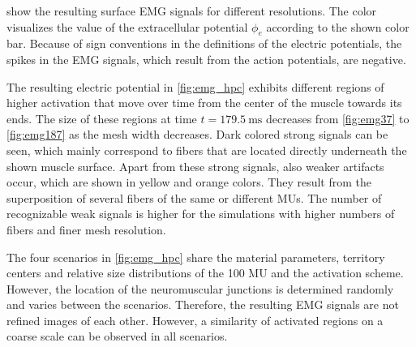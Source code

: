  show the resulting surface EMG signals for different resolutions. The color visualizes the value of the extracellular potential $\phi_e$ according to the shown color bar. Because of sign conventions in the definitions of the electric potentials, the spikes in the EMG signals, which result from the action potentials, are negative.

The resulting electric potential in \cref{fig:emg_hpc} exhibits different regions of higher activation that move over time from the center of the muscle towards its ends. The size of these regions at time ${t=\SI{179.5}{\ms}}$ decreases from \cref{fig:emg37} to \cref{fig:emg187} as the mesh width decreases. 
Dark colored strong signals can be seen, which mainly correspond to fibers that are located directly underneath the shown muscle surface.
Apart from these strong signals, also weaker artifacts occur, which are shown in yellow and orange colors. They result from the superposition of several fibers of the same or different MUs. The number of recognizable weak signals is higher for the simulations with higher numbers of fibers and finer mesh resolution.

The four scenarios in \cref{fig:emg_hpc} share the material parameters, territory centers and relative size distributions of the 100 MU and the activation scheme. However, the location of the neuromuscular junctions is determined randomly and varies between the scenarios. Therefore, the resulting EMG signals are not refined images of each other.  However, a similarity of activated regions on a coarse scale can be observed in all scenarios.

